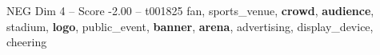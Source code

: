 \begin{textsample}{NEG Dim 4 – Score -2.00 – t001825}  \label{ex:f4_neg_012}
fan, sports\_venue, \textbf{crowd}, \textbf{audience}, stadium, \textbf{logo}, public\_event, \textbf{banner}, \textbf{arena}, advertising, display\_device, cheering

\end{textsample}
